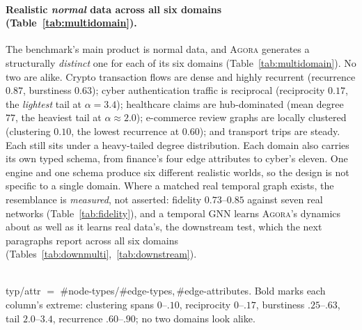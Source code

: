 \documentclass[sigconf,review,anonymous]{acmart}
\newcommand{\sys}{\textsc{Agora}\xspace}
\begin{document}
\paragraph{Realistic \emph{normal} data across all six domains (Table~\ref{tab:multidomain}).}
The benchmark's main product is normal data, and \sys{} generates a structurally
\emph{distinct} one for each of its six domains (Table~\ref{tab:multidomain}). No two
are alike. Crypto transaction flows are dense and highly recurrent (recurrence $0.87$,
burstiness $0.63$); cyber authentication traffic is reciprocal (reciprocity $0.17$, the
\emph{lightest} tail at $\alpha\!=\!3.4$); healthcare claims are hub-dominated (mean
degree $77$, the heaviest tail at $\alpha\!\approx\!2.0$); e-commerce review graphs are
locally clustered (clustering $0.10$, the lowest recurrence at $0.60$); and transport
trips are steady. Each still sits under a heavy-tailed degree distribution. Each domain
also carries its own typed schema, from finance's four edge attributes to cyber's
eleven. One engine and one schema produce six different realistic worlds, so the design
is not specific to a single domain. Where a matched real temporal graph exists, the
resemblance is
\emph{measured}, not asserted: fidelity $0.73$--$0.85$ against seven real networks
(Table~\ref{tab:fidelity}), and a temporal GNN learns \sys{}'s dynamics about as well
as it learns real data's, the downstream test, which the next paragraphs
report across all six domains (Tables~\ref{tab:downmulti},~\ref{tab:downstream}).

\begin{table}[t]
\caption{All six \sys{} domains generate a structurally \emph{distinct} normal graph
(2M edges each, anomalies off, one fixed seed). One engine and one schema, six
different worlds.}
\label{tab:multidomain}
\scriptsize\centering
\setlength{\tabcolsep}{3.1pt}
\\[2pt]
{\footnotesize typ/attr $=$ \#node-types/\#edge-types,\,\#edge-attributes.
Bold marks each column's extreme: clustering spans $0$--$.10$, reciprocity $0$--$.17$,
burstiness $.25$--$.63$, tail $2.0$--$3.4$, recurrence $.60$--$.90$; no two domains
look alike.}
\end{table}
\end{document}
